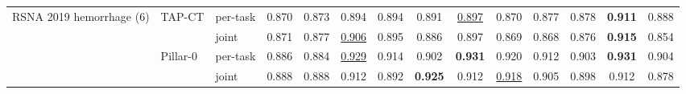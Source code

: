 \begin{tabular}{@{}lllccccccccccc@{}}
\addlinespace
RSNA 2019 hemorrhage (6) & TAP-CT & per-task & 0.870 & 0.873 & 0.894 & 0.894 & \cellcolor{modebest}0.891 & \underline{0.897} & \cellcolor{modebest}0.870 & \cellcolor{modebest}0.877 & \cellcolor{modebest}0.878 & \textbf{0.911} & \cellcolor{modebest}0.888 \\
 &  & joint & \cellcolor{modebest}0.871 & \cellcolor{modebest}0.877 & \cellcolor{modebest}\underline{0.906} & \cellcolor{modebest}0.895 & 0.886 & 0.897 & 0.869 & 0.868 & 0.876 & \cellcolor{modebest}\textbf{0.915} & 0.854 \\
\addlinespace[1.5pt]
 & Pillar-0 & per-task & 0.886 & 0.884 & \cellcolor{modebest}\underline{0.929} & \cellcolor{modebest}0.914 & 0.902 & \cellcolor{modebest}\textbf{0.931} & \cellcolor{modebest}0.920 & \cellcolor{modebest}0.912 & \cellcolor{modebest}0.903 & \cellcolor{modebest}\textbf{0.931} & \cellcolor{modebest}0.904 \\
 &  & joint & \cellcolor{modebest}0.888 & \cellcolor{modebest}0.888 & 0.912 & 0.892 & \cellcolor{modebest}\textbf{0.925} & 0.912 & \underline{0.918} & 0.905 & 0.898 & 0.912 & 0.878 \\
\bottomrule
\end{tabular}
